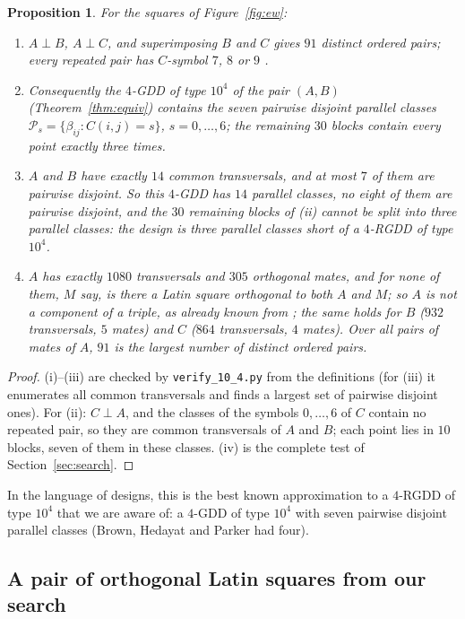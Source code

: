 \documentclass[11pt]{article}
\newtheorem{proposition}[theorem]{Proposition}
\theoremstyle{remark}
\begin{document}
\begin{proposition}\label{prop:ew}
For the squares of Figure~\ref{fig:ew}:
\begin{enumerate}
\item[(i)] $A\perp B$, $A\perp C$, and superimposing $B$ and $C$ gives $91$ distinct
  ordered pairs; every repeated pair has $C$-symbol $7$, $8$ or $9$ \cite{EW16}.
\item[(ii)] Consequently the $4$-GDD of type $10^4$ of the pair $(A,B)$
  (Theorem~\ref{thm:equiv}) contains the seven pairwise disjoint parallel classes
  $\mathcal P_s=\{\beta_{ij}: C(i,j)=s\}$, $s=0,\dots,6$; the remaining $30$ blocks contain
  every point exactly three times.
\item[(iii)] $A$ and $B$ have exactly $14$ common transversals, and at most $7$ of them are
  pairwise disjoint.  So this $4$-GDD has $14$ parallel classes, no eight of them are
  pairwise disjoint, and the $30$ remaining blocks of (ii) cannot be split into three
  parallel classes: the design is three parallel classes short of a $4$-RGDD of type
  $10^4$.
\item[(iv)] $A$ has exactly $1080$ transversals and $305$ orthogonal mates, and for none of
  them, $M$ say, is there a Latin square orthogonal to both $A$ and $M$; so $A$ is not a
  component of a triple, as already known from \cite{MMM07,EW16}; the same holds for $B$
  ($932$ transversals, $5$ mates) and $C$ ($864$ transversals, $4$ mates).  Over all pairs
  of mates of $A$, $91$ is the largest number of distinct ordered pairs.
\end{enumerate}
\end{proposition}

\begin{proof}
(i)--(iii) are checked by \texttt{verify\_10\_4.py} from the definitions (for (iii) it
enumerates all common transversals and finds a largest set of pairwise disjoint ones).
For (ii): $C\perp A$, and the classes of the symbols $0,\dots,6$ of $C$ contain no repeated
pair, so they are common transversals of $A$ and $B$; each point lies in $10$ blocks, seven
of them in these classes.  (iv) is the complete test of Section~\ref{sec:search}.
\end{proof}

In the language of designs, this is the best known approximation to a $4$-RGDD of type
$10^4$ that we are aware of: a $4$-GDD of type $10^4$ with seven pairwise disjoint
parallel classes (Brown, Hedayat and Parker \cite{BHP93} had four).

\subsection{A pair of orthogonal Latin squares from our search}\label{sec:ourpair}
\end{document}
